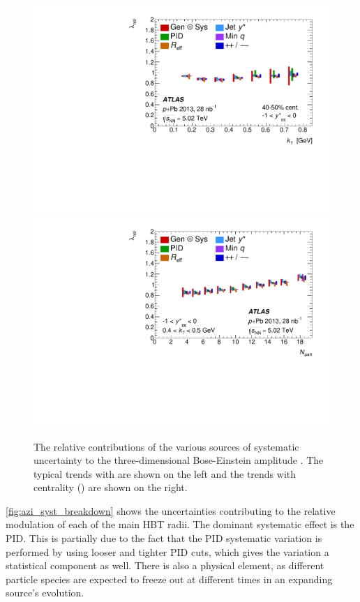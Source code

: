 \begin{figure}[t]
\centering
\includegraphics[width=0.49\linewidth]{canqosl_x_vs_kt_systs.pdf}
\includegraphics[width=0.49\linewidth]{canqosl_x_vs_npart_systs.pdf}\\
\caption{The relative contributions of the various sources of systematic uncertainty to the three-dimensional Bose-Einstein amplitude \losl. The typical trends with \kt are shown on the left and the trends with centrality (\Npart) are shown on the right.}
\label{fig:syst_losl}
\end{figure}

\FloatBarrier
\cref{fig:azi_syst_breakdown} shows the uncertainties contributing to the relative modulation of each of the main HBT radii. The dominant systematic effect is the \ac{PID}. This is partially due to the fact that the \ac{PID} systematic variation is performed by using looser and tighter \ac{PID} cuts, which gives the variation a statistical component as well. There is also a physical element, as different particle species are expected to freeze out at different times in an expanding source's evolution.

